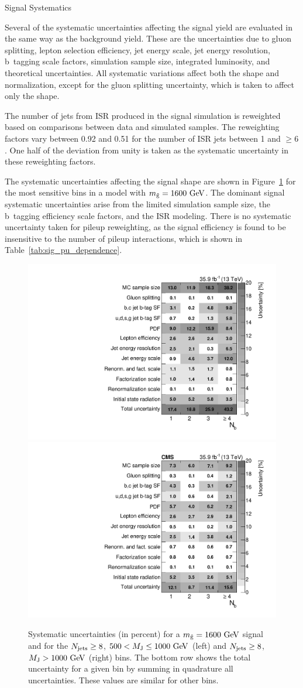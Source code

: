 \begin{section}{Signal Systematics}

Several of the systematic uncertainties affecting the signal yield are evaluated in the same way as the background yield.
These are the uncertainties due to gluon splitting, lepton selection efficiency, jet energy scale, jet energy resolution, b~tagging scale factors, simulation sample size, integrated luminosity, and theoretical uncertainties.
All systematic variations affect both the \Nb shape and normalization, except for the gluon splitting uncertainty, which is taken to affect only the \Nb shape.

The number of jets from ISR produced in the signal simulation is reweighted based on comparisons between data and simulated \ttbar samples.
The reweighting factors vary between 0.92 and 0.51 for the number of ISR jets between 1 and $\ge6$.
One half of the deviation from unity is taken as the systematic uncertainty in these reweighting factors.

The systematic uncertainties affecting the signal \Nb shape are shown in Figure~\ref{fig:sig_sys_tables} for the most sensitive bins in a model with $m_{\tilde{\mathrm{g}}} = 1600~\mathrm{Ge\kern -0.1em V}$.
The dominant signal systematic uncertainties arise from the limited simulation sample size, the b~tagging efficiency scale factors, and the ISR modeling.
There is no systematic uncertainty taken for pileup reweighting, as the signal efficiency is found to be insensitive to the number of pileup interactions, which is shown in Table~\ref{tab:sig_pu_dependence}.

\begin{figure}[tbp!]
\begin{center}
\includegraphics[angle=0,width=0.45\columnwidth]{fig/table_sig_systs_bin20_m1600.pdf}
\includegraphics[angle=0,width=0.45\columnwidth]{fig/table_sig_systs_bin21_m1600.pdf}
\end{center}
\caption{Systematic uncertainties (in percent) for a $m_{\tilde{\mathrm{g}}} = 1600~\mathrm{Ge\kern -0.1em V}$ signal and for the $N_{\mathrm{jets}} \geq 8$, $500 < M_{\mathrm{J}} \leq 1000~\mathrm{Ge\kern -0.1em V}$ (left) and $N_{\mathrm{jets}} \geq 8$, $M_{\mathrm{J}} > 1000~\mathrm{Ge\kern -0.1em V}$ (right) bins.
The bottom row shows the total uncertainty for a given \Nb bin by summing in quadrature all uncertainties.
These values are similar for other bins.}
\label{fig:sig_sys_tables}
\end{figure}


\end{section}
